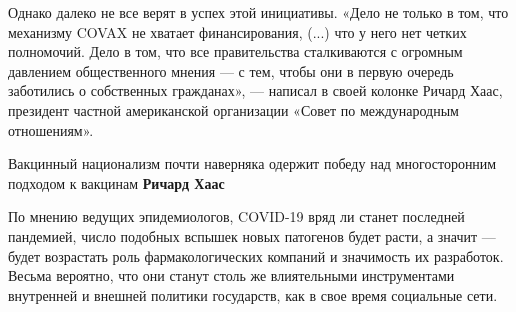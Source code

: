 Однако далеко не все верят в успех этой инициативы. «Дело не только в том, что
механизму COVAX не хватает финансирования, (...) что у него нет четких
полномочий. Дело в том, что все правительства сталкиваются с огромным давлением
общественного мнения — с тем, чтобы они в первую очередь заботились о
собственных гражданах», — написал в своей колонке Ричард Хаас, президент
частной американской организации «Совет по международным отношениям».

Вакцинный национализм почти наверняка одержит победу над многосторонним подходом к вакцинам
\textbf{Ричард Хаас}

По мнению ведущих эпидемиологов, COVID-19 вряд ли станет последней пандемией,
число подобных вспышек новых патогенов будет расти, а значит — будет возрастать
роль фармакологических компаний и значимость их разработок. Весьма вероятно,
что они станут столь же влиятельными инструментами внутренней и внешней
политики государств, как в свое время социальные сети.

